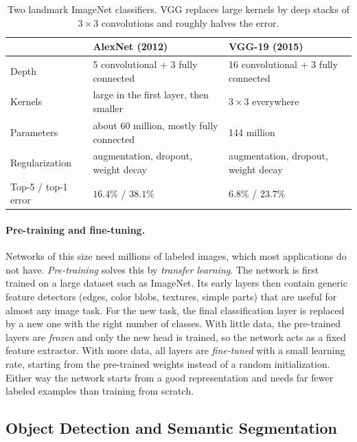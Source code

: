 \begin{table}[ht]
  \centering
  \begin{tabular}{@{}p{3.4cm}p{5.0cm}p{5.0cm}@{}}
    \toprule
    & AlexNet (2012) & VGG-19 (2015) \\
    \midrule
    Depth & 5 convolutional + 3 fully connected & 16 convolutional + 3 fully
      connected \\
    Kernels & large in the first layer, then smaller & $3\times3$ everywhere \\
    Parameters & about 60 million, mostly fully connected & 144 million \\
    Regularization & augmentation, dropout, weight decay & augmentation, dropout,
      weight decay \\
    Top-5 / top-1 error & $16.4\%$ / $38.1\%$ & $6.8\%$ / $23.7\%$ \\
    \bottomrule
  \end{tabular}
  \caption{Two landmark ImageNet classifiers. VGG replaces large kernels by deep
  stacks of $3\times3$ convolutions and roughly halves the error.}
  \label{tab:alexnet-vgg}
\end{table}

\paragraph{Pre-training and fine-tuning.}
Networks of this size need millions of labeled images, which most applications
do not have. \emph{Pre-training} solves this by \emph{transfer learning}. The
network is first trained on a large dataset such as ImageNet. Its early layers
then contain generic feature detectors (edges, color blobs, textures, simple
parts) that are useful for almost any image task. For the new task, the final
classification layer is replaced by a new one with the right number of classes.
With little data, the pre-trained layers are \emph{frozen} and only the new head
is trained, so the network acts as a fixed feature extractor. With more data,
all layers are \emph{fine-tuned} with a small learning rate, starting from the
pre-trained weights instead of a random initialization. Either way the network
starts from a good representation and needs far fewer labeled examples than
training from scratch.

\subsection{Object Detection and Semantic Segmentation}

